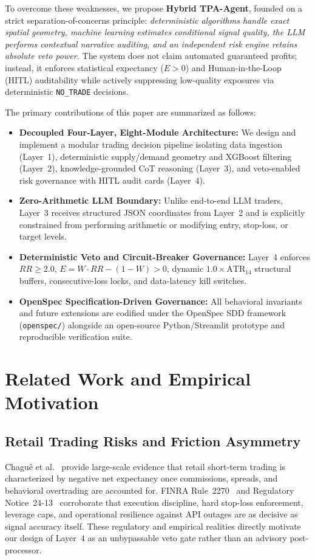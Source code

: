 \documentclass[conference]{IEEEtran}
\begin{document}
To overcome these weaknesses, we propose \textbf{Hybrid TPA-Agent}, founded on a strict separation-of-concerns principle: \emph{deterministic algorithms handle exact spatial geometry, machine learning estimates conditional signal quality, the LLM performs contextual narrative auditing, and an independent risk engine retains absolute veto power.} The system does not claim automated guaranteed profits; instead, it enforces statistical expectancy ($E > 0$) and Human-in-the-Loop (HITL) auditability while actively suppressing low-quality exposures via deterministic \texttt{NO\_TRADE} decisions.

The primary contributions of this paper are summarized as follows:
\begin{itemize}
    \item \textbf{Decoupled Four-Layer, Eight-Module Architecture:} We design and implement a modular trading decision pipeline isolating data ingestion (Layer~1), deterministic supply/demand geometry and XGBoost filtering (Layer~2), knowledge-grounded CoT reasoning (Layer~3), and veto-enabled risk governance with HITL audit cards (Layer~4).
    \item \textbf{Zero-Arithmetic LLM Boundary:} Unlike end-to-end LLM traders, Layer~3 receives structured JSON coordinates from Layer~2 and is explicitly constrained from performing arithmetic or modifying entry, stop-loss, or target levels.
    \item \textbf{Deterministic Veto and Circuit-Breaker Governance:} Layer~4 enforces $RR \ge 2.0$, $E = W \cdot RR - (1 - W) > 0$, dynamic $1.0 \times \text{ATR}_{14}$ structural buffers, consecutive-loss locks, and data-latency kill switches.
    \item \textbf{OpenSpec Specification-Driven Governance:} All behavioral invariants and future extensions are codified under the OpenSpec SDD framework (\texttt{openspec/}) alongside an open-source Python/Streamlit prototype and reproducible verification suite.
\end{itemize}

\section{Related Work and Empirical Motivation}
\subsection{Retail Trading Risks and Friction Asymmetry}
Chagu{\^e} et al.~\cite{chague2019day} provide large-scale evidence that retail short-term trading is characterized by negative net expectancy once commissions, spreads, and behavioral overtrading are accounted for. FINRA Rule~2270~\cite{finra2270} and Regulatory Notice~24-13~\cite{finra2413} corroborate that execution discipline, hard stop-loss enforcement, leverage caps, and operational resilience against API outages are as decisive as signal accuracy itself. These regulatory and empirical realities directly motivate our design of Layer~4 as an unbypassable veto gate rather than an advisory post-processor.
\end{document}
